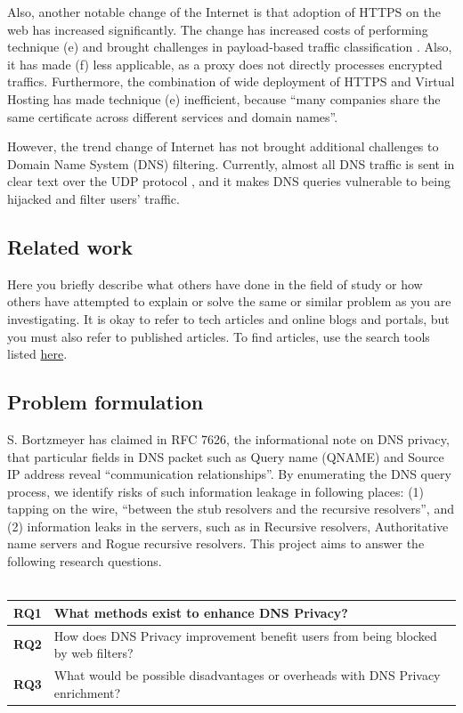 \documentclass[a4paper,12pt]{article}
\begin{document}
Also, another notable change of the Internet is that adoption of HTTPS on the web has increased significantly\cite{felt2017measuring}.
The change has increased costs of performing technique (e) and brought challenges in payload-based traffic classification \cite{xue2013traffic}.
Also, it has made (f) less applicable, as a proxy does not directly processes encrypted traffics\cite{shbair2015efficiently}.
Furthermore, the combination of wide deployment of HTTPS and Virtual Hosting has made technique (e) inefficient, because ``many companies share the same certificate across different services and domain names\cite{shbair2015efficiently}''.

However, the trend change of Internet has not brought additional challenges to Domain Name System (DNS) filtering. Currently, almost all DNS traffic is sent in clear text \cite{rfc7626} over the UDP protocol \cite{tcp2014analysis}, and it makes DNS queries vulnerable to being hijacked and filter users' traffic.

\subsection{Related work}
Here you briefly describe what others have done in the field of study or how others have attempted to explain or solve the same or similar problem as you are investigating. It is okay to refer to tech articles and online blogs and portals, but you must also refer to published articles. To find articles, use the search tools listed \href{https://coursepress.lnu.se/subject/thesis-projects/tools/}{here}.

\subsection{Problem formulation}
S. Bortzmeyer has claimed in RFC 7626, the informational note on DNS privacy\cite{rfc7626}, that particular fields in DNS packet\cite{rfc1035} such as Query name  (QNAME) and Source IP address reveal ``communication relationships''. By enumerating the DNS query process, we identify risks of such information leakage in following places: (1) tapping on the wire, ``between the stub resolvers and the recursive resolvers'', and (2) information leaks in the servers, such as in Recursive resolvers, Authoritative name servers and Rogue recursive resolvers. This project aims to answer the following research questions.
\\\\
\begin{tabular} {|p{1.2cm}|p{11.6cm}|} \hline
  \textbf{RQ1} & What methods exist to enhance DNS Privacy? \\ \hline
  \textbf{RQ2} & How does DNS Privacy improvement benefit users from being blocked by web filters?\\ \hline
  \textbf{RQ3} & What would be possible disadvantages or overheads with DNS Privacy enrichment? \\ \hline
  \end{tabular}
\end{document}
